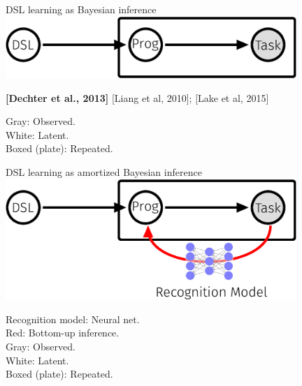 \documentclass{beamer}
\begin{document}
\begin{frame}[t]{DSL learning as Bayesian inference}
  \includegraphics[width = 11cm]{figures/animation/EC.eps}

\vspace{1cm}
  
  \textbf{[Dechter et al., 2013]}  [Liang et al, 2010]; [Lake et al, 2015]

  \vfill
  Gray: Observed.\\
  White: Latent.\\
  Boxed (plate): Repeated.\\
  
\end{frame}
\begin{frame}[t]{DSL learning as \alert{amortized} Bayesian inference}
  \includegraphics[width = 11cm]{figures/animation/DC.eps}

  \vfill
  Recognition model: Neural net.\\
  Red: Bottom-up inference.\\
  Gray: Observed.\\
  White: Latent.\\
  Boxed (plate): Repeated.\\

\end{frame}
\end{document}
